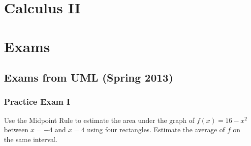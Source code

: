 \documentclass[crop=false,class=article,oneside]{standalone}
\begin{document}
    \ifx\ifmathcoursescalculusII\undefined
        \section*{Calculus II}
        \setcounter{section}{2}
        \renewcommand\thefigure{\arabic{section}.\arabic{figure}}
        \renewcommand\thesubfigure{%
            \arabic{section}.\arabic{figure}.\arabic{subfigure}}
    \else
        \section{Exams}
    \fi
    \subsection{Exams from UML (Spring 2013)}
        \subsubsection{Practice Exam I}
        \begin{problem}
        Use the Midpoint Rule to estimate the area under the
        graph of $f(x)=16-x^{2}$ between $x=-4$ and $x=4$ using
        four rectangles. Estimate the average of $f$
        on the same interval.
        \end{problem}
\end{document}
